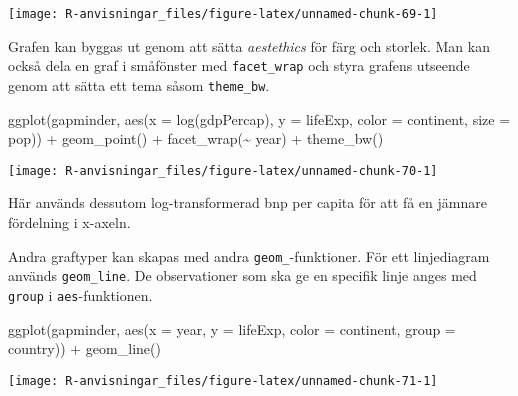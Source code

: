 \documentclass[
]{book}
\newenvironment{Shaded}{\begin{snugshade}}{\end{snugshade}}
\newcommand{\AttributeTok}[1]{\textcolor[rgb]{0.77,0.63,0.00}{#1}}
\newcommand{\FunctionTok}[1]{\textcolor[rgb]{0.00,0.00,0.00}{#1}}
\newcommand{\NormalTok}[1]{#1}
\newcommand{\SpecialCharTok}[1]{\textcolor[rgb]{0.00,0.00,0.00}{#1}}
\theoremstyle{definition}
\theoremstyle{definition}
\theoremstyle{definition}
\theoremstyle{definition}
\theoremstyle{remark}
\begin{document}
\begin{center}\texttt{[image: R-anvisningar\_files/figure-latex/unnamed-chunk-69-1]} \end{center}

Grafen kan byggas ut genom att sätta \emph{aestethics} för färg och storlek. Man kan också dela en graf i småfönster med \texttt{facet\_wrap} och styra grafens utseende genom att sätta ett tema såsom \texttt{theme\_bw}.

\begin{Shaded}
\begin{Highlighting}[]
\FunctionTok{ggplot}\NormalTok{(gapminder, }\FunctionTok{aes}\NormalTok{(}\AttributeTok{x =} \FunctionTok{log}\NormalTok{(gdpPercap), }\AttributeTok{y =}\NormalTok{ lifeExp, }\AttributeTok{color =}\NormalTok{ continent, }\AttributeTok{size =}\NormalTok{ pop)) }\SpecialCharTok{+}
  \FunctionTok{geom\_point}\NormalTok{() }\SpecialCharTok{+}
  \FunctionTok{facet\_wrap}\NormalTok{(}\SpecialCharTok{\textasciitilde{}}\NormalTok{ year) }\SpecialCharTok{+}
  \FunctionTok{theme\_bw}\NormalTok{()}
\end{Highlighting}
\end{Shaded}

\begin{center}\texttt{[image: R-anvisningar\_files/figure-latex/unnamed-chunk-70-1]} \end{center}

Här används dessutom log-transformerad bnp per capita för att få en jämnare fördelning i x-axeln.

Andra graftyper kan skapas med andra \texttt{geom\_}-funktioner. För ett linjediagram används \texttt{geom\_line}. De observationer som ska ge en specifik linje anges med \texttt{group} i \texttt{aes}-funktionen.

\begin{Shaded}
\begin{Highlighting}[]
\FunctionTok{ggplot}\NormalTok{(gapminder, }\FunctionTok{aes}\NormalTok{(}\AttributeTok{x =}\NormalTok{ year, }\AttributeTok{y =}\NormalTok{ lifeExp, }\AttributeTok{color =}\NormalTok{ continent, }\AttributeTok{group =}\NormalTok{ country)) }\SpecialCharTok{+}
  \FunctionTok{geom\_line}\NormalTok{()}
\end{Highlighting}
\end{Shaded}

\begin{center}\texttt{[image: R-anvisningar\_files/figure-latex/unnamed-chunk-71-1]} \end{center}
\end{document}
